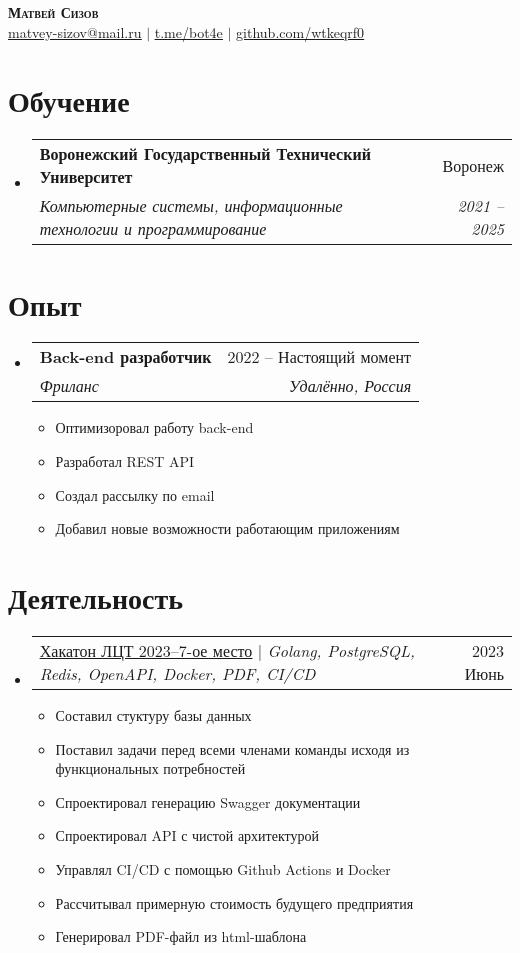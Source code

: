 \documentclass[letterpaper,11pt]{article}
\makeatletter
\newcommand{\resumeItem}[1]{
  \item\small{
    {#1 \vspace{-2pt}}
  }
}
\newcommand{\resumeSubheading}[4]{
  \vspace{-2pt}\item
    \begin{tabular*}{0.97\textwidth}[t]{l@{\extracolsep{\fill}}r}
      \textbf{#1} & #2 \\
      \textit{\small#3} & \textit{\small #4} \\
    \end{tabular*}\vspace{-7pt}
}
\newcommand{\resumeProjectHeading}[2]{
    \item
    \begin{tabular*}{0.97\textwidth}{l@{\extracolsep{\fill}}r}
      \small#1 & #2 \\
    \end{tabular*}\vspace{-7pt}
}
\newcommand{\resumeSubHeadingListStart}{\begin{itemize}[leftmargin=0.15in, label={}]}
\newcommand{\resumeSubHeadingListEnd}{\end{itemize}}
\newcommand{\resumeItemListStart}{\begin{itemize}}
\newcommand{\resumeItemListEnd}{\end{itemize}\vspace{-5pt}}
\makeatother
\begin{document}

\begin{center}
	\textbf{\Huge \scshape Матвей Сизов} \\ \vspace{1pt}
	\href{mailto:matvey-sizov@mail.ru}{\underline{matvey-sizov@mail.ru}} $|$ 
	\href{https://t.me/bot4e}{\underline{t.me/bot4e}} $|$
	\href{https://github.com/wtkeqrf0}{\underline{github.com/wtkeqrf0}}
\end{center}

\section{Обучение}
\resumeSubHeadingListStart
\resumeSubheading
{Воронежский Государственный Технический Университет}{Воронеж}
{Компьютерные системы, информационные технологии и программирование}{2021 -- 2025}
\resumeSubHeadingListEnd

\section{Опыт}
\resumeSubHeadingListStart

\resumeSubheading
{Back-end разработчик\emph{}}{2022 -- Настоящий момент}
{Фриланс}{Удалённо, Россия}
\resumeItemListStart
\resumeItem{Оптимизоровал работу back-end}
\resumeItem{Разработал REST API}
\resumeItem{Создал рассылку по email}
\resumeItem{Добавил новые возможности работающим приложениям}
\resumeItemListEnd

\resumeSubHeadingListEnd

\section{Деятельность}
\resumeSubHeadingListStart
\resumeProjectHeading
{\href{https://wtkeqrf0.github.io/CV/Leaders_Digital_Transformations_2023.pdf}{\underline{Хакатон ЛЦТ 2023--7-ое место}} $|$ \emph{Golang, PostgreSQL, Redis, OpenAPI, Docker, PDF, CI/CD}}{2023 Июнь}
\resumeItemListStart
\resumeItem{Составил стуктуру базы данных}
\resumeItem{Поставил задачи перед всеми членами команды исходя из функциональных потребностей}
\resumeItem{Спроектировал генерацию Swagger документации}
\resumeItem{Спроектировал API с чистой архитектурой}
\resumeItem{Управлял CI/CD с помощью Github Actions и Docker}
\resumeItem{Рассчитывал примерную стоимость будущего предприятия}
\resumeItem{Генерировал PDF-файл из html-шаблона}
\resumeItemListEnd
\resumeSubHeadingListEnd
\end{document}
